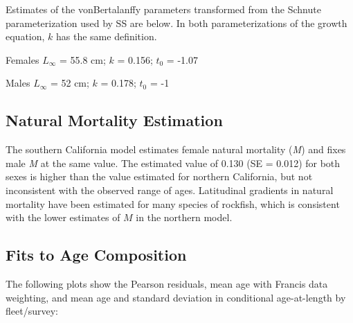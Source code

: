 \documentclass[11pt,
  english,
]{article}
\begin{document}
Estimates of the vonBertalanffy parameters transformed from the Schnute parameterization used by SS are below. In both parameterizations of the growth equation, {\(k\)\leavevmode\tagmcend\tagstructend} has the same definition.

\begin{centering}

Females $L_{\infty}$ = 55.8 cm; $k$ = 0.156; $t_0$ = -1.07

Males $L_{\infty}$ = 52 cm; $k$ = 0.178; $t_0$ = -1

\end{centering}

\vspace{0.5cm}


\hypertarget{natural-mortality-estimation}{%
\subsection{Natural Mortality Estimation}\label{natural-mortality-estimation}}

\leavevmode\tagmcend\tagstructend

The southern California model estimates female natural mortality (\emph{M}) and fixes male \emph{M} at the same value. The estimated value of 0.130 (SE = 0.012) for both sexes is higher than the value estimated for northern California, but not inconsistent with the observed range of ages. Latitudinal gradients in natural mortality have been estimated for many species of rockfish, which is consistent with the lower estimates of {\(M\)\leavevmode\tagmcend\tagstructend} in the northern model.


\hypertarget{fits-to-age-composition}{%
\subsection{Fits to Age Composition}\label{fits-to-age-composition}}

\leavevmode\tagmcend\tagstructend

The following plots show the Pearson residuals, mean age with Francis data weighting, and mean age and standard deviation in conditional age-at-length by fleet/survey:

\end{document}
